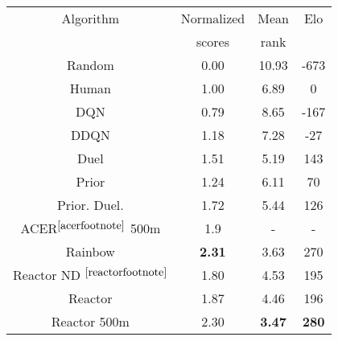\begin{tabular}{| c | c | c | c |}
\hline
Algorithm & Normalized & Mean& Elo \\
 & scores & rank &\\
\hline
Random & 0.00 & 10.93 & -673\\
Human & 1.00 & 6.89 & 0\\
DQN & 0.79 & 8.65 & -167\\
DDQN & 1.18 & 7.28 & -27\\
Duel & 1.51 & 5.19 & 143\\
Prior & 1.24 & 6.11 & 70\\
Prior. Duel. & 1.72 & 5.44 & 126\\
ACER$^{\ref{acerfootnote}}$ 500m & 1.9 & - & - \\
Rainbow & {\bf 2.31} & 3.63 & 270\\
Reactor ND $^{\ref{reactorfootnote}}$ & 1.80 & 4.53 & 195\\
Reactor & 1.87 & 4.46 & 196\\
Reactor 500m & 2.30 & {\bf 3.47} & {\bf 280}\\
\hline
\end{tabular}
